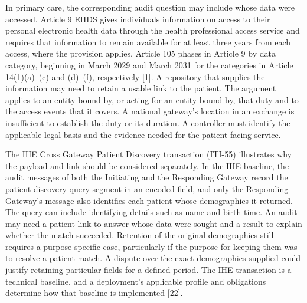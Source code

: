 \documentclass[preprint,review,12pt]{elsarticle}
\begin{document}
In primary care, the corresponding audit question may include whose data
were accessed. Article 9 EHDS gives individuals information on access to
their personal electronic health data through the health professional
access service and requires that information to remain available for at
least three years from each access, where the provision applies. Article
105 phases in Article 9 by data category, beginning in March 2029 and
March 2031 for the categories in Article 14(1)(a)--(c) and (d)--(f),
respectively {[}1{]}. A repository that supplies the information may
need to retain a usable link to the patient. The argument applies to an
entity bound by, or acting for an entity bound by, that duty and to the
access events that it covers. A national gateway's location in an
exchange is insufficient to establish the duty or its duration. A
controller must identify the applicable legal basis and the evidence
needed for the patient-facing service.

The IHE Cross Gateway Patient Discovery transaction (ITI-55) illustrates
why the payload and link should be considered separately. In the IHE
baseline, the audit messages of both the Initiating and the Responding
Gateway record the patient-discovery query segment in an encoded field,
and only the Responding Gateway's message also identifies each patient
whose demographics it returned. The query can include identifying
details such as name and birth time. An audit may need a patient link to
answer whose data were sought and a result to explain whether the match
succeeded. Retention of the original demographics still requires a
purpose-specific case, particularly if the purpose for keeping them was
to resolve a patient match. A dispute over the exact demographics
supplied could justify retaining particular fields for a defined period.
The IHE transaction is a technical baseline, and a deployment's
applicable profile and obligations determine how that baseline is
implemented {[}22{]}.
\end{document}
